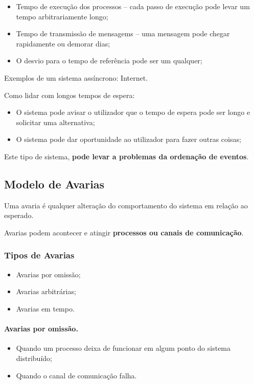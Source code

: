 \documentclass{article}
\begin{document}
\begin{itemize}
	\item Tempo de execução dos processos -- cada passo de execução pode levar um tempo arbitrariamente longo;
	\item Tempo de transmissão de mensagems -- uma mensagem pode chegar rapidamente ou demorar dias;
	\item O desvio para o tempo de referência pode ser um qualquer;
\end{itemize} 

Exemplos de um sistema assíncrono: Internet.

Como lidar com longos tempos de espera:

\begin{itemize}
	\item O sistema pode avisar o utilizador que o tempo de espera pode ser longo e solicitar uma alternativa;
	\item O sistema pode dar oportunidade ao utilizador para fazer outras coisas;
\end{itemize}

Este tipo de sistema, \textbf{pode levar a problemas da ordenação de eventos}.

\subsection{Modelo de Avarias}

Uma avaria é qualquer alteração do comportamento do sistema em relação ao esperado.

Avarias podem acontecer e atingir \textbf{processos ou canais de comunicação}.

\subsubsection{Tipos de Avarias}

\begin{itemize}
	\item Avarias por omissão;
	\item Avarias arbitrárias;
	\item Avarias em tempo.
\end{itemize}

\paragraph{Avarias por omissão.}

\begin{itemize}
	\item Quando um processo deixa de funcionar em algum ponto do sistema distribuído;
	\item Quando o canal de comunicação falha.
\end{itemize}
\end{document}
